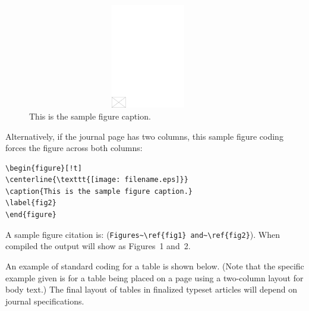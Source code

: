 \documentclass[11pt]{article}
\begin{document}
\clearpage

\begin{figure}[!t]
\vspace*{-24pt}
\centering
\includegraphics[width=300pt,height=130pt,draft]{empty}
\caption{This is the sample f{i}gure caption.}
\label{fig1}
\end{figure}


\noindent Alternatively, if the journal page has two columns, this sample f{i}gure coding forces the f{i}gure across both columns:
\begin{verbatim}
\begin{figure}[!t]
\centerline{\texttt{[image: filename.eps]}}
\caption{This is the sample figure caption.}
\label{fig2}
\end{figure}
\end{verbatim}
A sample f{i}gure citation is: (\verb|Figures~\ref{fig1} and~\ref{fig2}|). When compiled the output will show as Figures~1 and~2.\vskip10pt

\noindent An example of standard coding for a table is shown below. (Note that the specif{i}c example given is for a table being placed on a page using a two-column layout for body text.) The f{i}nal layout of tables in f{i}nalized typeset articles will depend on journal specif{i}cations.
\end{document}
